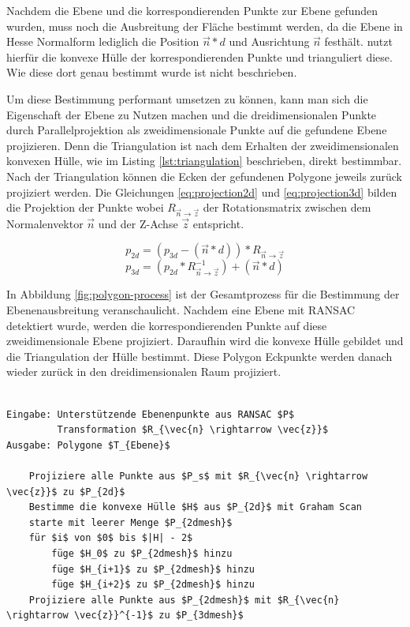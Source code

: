 Nachdem die Ebene und die korrespondierenden Punkte zur Ebene gefunden wurden, muss noch die Ausbreitung der Fläche bestimmt werden, da die Ebene in Hesse Normalform lediglich die Position \(\vec{n} * d\) und Ausrichtung \(\vec{n}\) festhält. \citet{PlanarSurfaceMapping} nutzt hierfür die konvexe Hülle der korrespondierenden Punkte und trianguliert diese. Wie diese dort genau bestimmt wurde ist nicht beschrieben. 

Um diese Bestimmung performant umsetzen zu können, kann man sich die Eigenschaft der Ebene zu Nutzen machen und die dreidimensionalen Punkte durch Parallelprojektion als zweidimensionale Punkte auf die gefundene Ebene projizieren. Denn die Triangulation ist nach dem Erhalten der zweidimensionalen konvexen Hülle, wie im Listing \ref{lst:triangulation} beschrieben, direkt bestimmbar. Nach der Triangulation können die Ecken der gefundenen Polygone jeweils zurück projiziert werden. Die Gleichungen \ref{eq:projection2d} und \ref{eq:projection3d} bilden die Projektion der Punkte wobei \(R_{\vec{n} \rightarrow \vec{z}}\) der Rotationsmatrix zwischen dem Normalenvektor \(\vec{n}\) und der Z-Achse \(\vec{z}\) entspricht.

\begin{equation} \label{eq:projection2d}
p_{2d} = (p_{3d} - (\vec{n}*d)) * R_{\vec{n} \rightarrow \vec{z}}
\end{equation}
\begin{equation} \label{eq:projection3d}
p_{3d} = (p_{2d} * R_{\vec{n} \rightarrow \vec{z}}^{-1}) + (\vec{n}*d)
\end{equation}

In Abbildung \ref{fig:polygon-process} ist der Gesamtprozess für die Bestimmung der Ebenenausbreitung veranschaulicht. Nachdem eine Ebene mit RANSAC detektiert wurde, werden die korrespondierenden Punkte auf diese zweidimensionale Ebene projiziert. Daraufhin wird die konvexe Hülle gebildet und die Triangulation der Hülle bestimmt. Diese Polygon Eckpunkte werden danach wieder zurück in den dreidimensionalen Raum projiziert.

\begin{lstlisting}[mathescape,caption=Bestimmung der Ebenenausbreitung und Triangulation, label=lst:triangulation, float=htb]

Eingabe: Unterstützende Ebenenpunkte aus RANSAC $P$
         Transformation $R_{\vec{n} \rightarrow \vec{z}}$
Ausgabe: Polygone $T_{Ebene}$

    Projiziere alle Punkte aus $P_s$ mit $R_{\vec{n} \rightarrow \vec{z}}$ zu $P_{2d}$
    Bestimme die konvexe Hülle $H$ aus $P_{2d}$ mit Graham Scan
    starte mit leerer Menge $P_{2dmesh}$
    für $i$ von $0$ bis $|H| - 2$
        füge $H_0$ zu $P_{2dmesh}$ hinzu
        füge $H_{i+1}$ zu $P_{2dmesh}$ hinzu
        füge $H_{i+2}$ zu $P_{2dmesh}$ hinzu
    Projiziere alle Punkte aus $P_{2dmesh}$ mit $R_{\vec{n} \rightarrow \vec{z}}^{-1}$ zu $P_{3dmesh}$   
\end{lstlisting}

